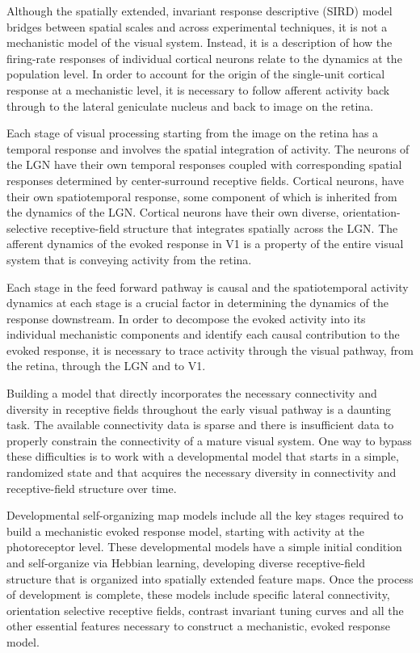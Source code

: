 \documentclass[phd,ianc,twoside]{infthesis}
\begin{document}
Although the spatially extended, invariant response descriptive (SIRD)
model bridges between spatial scales and across experimental techniques,
it is not a mechanistic model of the visual system. Instead, it is a
description of how the firing-rate responses of individual cortical
neurons relate to the dynamics at the population level. In order to
account for the origin of the single-unit cortical response at a
mechanistic level, it is necessary to follow afferent activity back
through to the lateral geniculate nucleus and back to image on the
retina.

Each stage of visual processing starting from the image on the retina
has a temporal response and involves the spatial integration of
activity. The neurons of the LGN have their own temporal responses
coupled with corresponding spatial responses determined by
center-surround receptive fields. Cortical neurons, have their own
spatiotemporal response, some component of which is inherited from the
dynamics of the LGN. Cortical neurons have their own diverse,
orientation-selective receptive-field structure that integrates
spatially across the LGN. The afferent dynamics of the evoked response
in V1 is a property of the entire visual system that is conveying
activity from the retina.

Each stage in the feed forward pathway is causal and the spatiotemporal
activity dynamics at each stage is a crucial factor in determining the
dynamics of the response downstream. In order to decompose the evoked
activity into its individual mechanistic components and identify each
causal contribution to the evoked response, it is necessary to trace
activity through the visual pathway, from the retina, through the LGN
and to V1.

Building a model that directly incorporates the necessary connectivity
and diversity in receptive fields throughout the early visual pathway is
a daunting task. The available connectivity data is sparse and there is
insufficient data to properly constrain the connectivity of a mature
visual system. One way to bypass these difficulties is to work with a
developmental model that starts in a simple, randomized state and that
acquires the necessary diversity in connectivity and receptive-field
structure over time.

Developmental self-organizing map models include all the key stages
required to build a mechanistic evoked response model, starting with
activity at the photoreceptor level. These developmental models have a
simple initial condition and self-organize via Hebbian learning,
developing diverse receptive-field structure that is organized into
spatially extended feature maps. Once the process of development is
complete, these models include specific lateral connectivity,
orientation selective receptive fields, contrast invariant tuning curves
and all the other essential features necessary to construct a
mechanistic, evoked response model.
\end{document}
